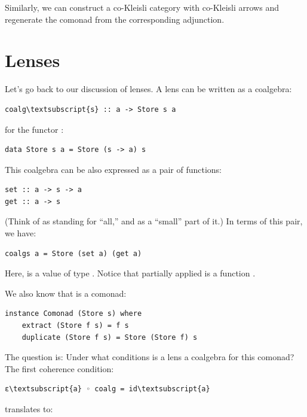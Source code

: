 Similarly, we can construct a co-Kleisli category with co-Kleisli arrows
and regenerate the comonad from the corresponding adjunction.

\section{Lenses}\label{lenses}

Let's go back to our discussion of lenses. A lens can be written as a
coalgebra:

\begin{Verbatim}[commandchars=\\\{\}]
coalg\textsubscript{s} :: a -> Store s a
\end{Verbatim}
for the functor :

\begin{Verbatim}[commandchars=\\\{\}]
data Store s a = Store (s -> a) s
\end{Verbatim}
This coalgebra can be also expressed as a pair of functions:

\begin{Verbatim}[commandchars=\\\{\}]
set :: a -> s -> a
get :: a -> s
\end{Verbatim}
(Think of  as standing for ``all,'' and  as a
``small'' part of it.) In terms of this pair, we have:

\begin{Verbatim}[commandchars=\\\{\}]
coalgs a = Store (set a) (get a)
\end{Verbatim}
Here,  is a value of type . Notice that partially
applied  is a function .

We also know that  is a comonad:

\begin{Verbatim}[commandchars=\\\{\}]
instance Comonad (Store s) where
    extract (Store f s) = f s
    duplicate (Store f s) = Store (Store f) s
\end{Verbatim}
The question is: Under what conditions is a lens a coalgebra for this
comonad? The first coherence condition:

\begin{Verbatim}[commandchars=\\\{\}]
ε\textsubscript{a} ◦ coalg = id\textsubscript{a}
\end{Verbatim}
translates to:

